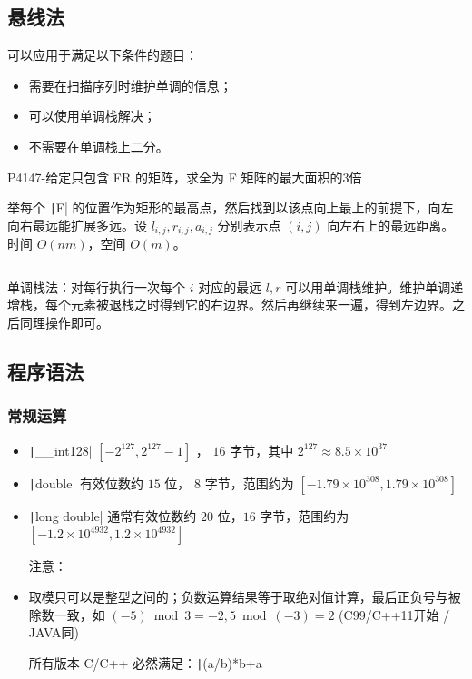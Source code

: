 \documentclass[twocolumn,10pt]{ctexart}
\begin{document}
\subsection{悬线法}

可以应用于满足以下条件的题目：

\begin{itemize}
\item 需要在扫描序列时维护单调的信息；
\item 可以使用单调栈解决；
\item 不需要在单调栈上二分。
\end{itemize}

\begin{notebox}
P4147-给定只包含 FR 的矩阵，求全为 F 矩阵的最大面积的3倍
\end{notebox}

举每个 \texttt|F| 的位置作为矩形的最高点，然后找到以该点向上最上的前提下，向左向右最远能扩展多远。设 $l_{i,j},r_{i,j},a_{i,j}$ 分别表示点 $(i,j)$ 向左右上的最远距离。时间 $O(nm)$，空间 $O(m)$。

\inputminted{cpp}{code/p4147_hoverline.cpp}

单调栈法：对每行执行一次每个 $i$ 对应的最远 $l,r$ 可以用单调栈维护。维护单调递增栈，每个元素被退栈之时得到它的右边界。然后再继续来一遍，得到左边界。之后同理操作即可。

\subsection{程序语法}

\subsubsection{常规运算}

\begin{itemize}
\item \texttt|__int128| $[-2^{127},2^{127}-1]$ ， $16$ 字节，其中 $2^{127}\approx8.5\times10^{37}$
\item \texttt|double| 有效位数约 $15$ 位， $8$ 字节，范围约为 $[-1.79\times10^{308},\allowbreak{}1.79\times10^{308}]$
\item \texttt|long double| 通常有效位数约 $20$ 位，$16$ 字节，范围约为 $[-1.2\times10^{4932},\allowbreak{}1.2\times10^{4932}]$

注意：
\end{itemize}

\begin{itemize}
\item 取模只可以是整型之间的；负数运算结果等于取绝对值计算，最后正负号与被除数一致，如 $(-5)\bmod 3=-2,5\bmod (-3)=2$  (C99/C++11开始 / JAVA同)

所有版本 C/C++ 必然满足：\texttt|(a/b)*b+a%
\end{itemize}
\end{document}
